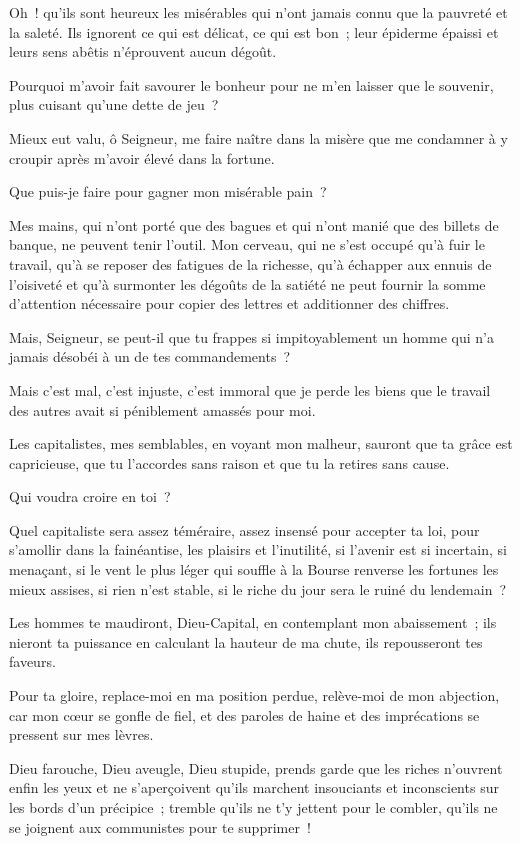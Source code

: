 \documentclass[french,twoside]{book} %
\begin{document}
Oh ! qu’ils sont heureux les misérables qui n’ont jamais connu que la pauvreté et la saleté. Ils ignorent ce qui est délicat, ce qui est bon ; leur épiderme épaissi et leurs sens abêtis n’éprouvent aucun dégoût.\par
Pourquoi m’avoir fait savourer le bonheur pour ne m’en laisser que le souvenir, plus cuisant qu’une dette de jeu ?\par
Mieux eut valu, ô Seigneur, me faire naître dans la misère que me condamner à y croupir après m’avoir élevé dans la fortune.\par
Que puis-je faire pour gagner mon misérable pain ?\par
Mes mains, qui n’ont porté que des bagues et qui n’ont manié que des billets de banque, ne peuvent tenir l’outil. Mon cerveau, qui ne s’est occupé qu’à fuir le travail, qu’à se reposer des fatigues de la richesse, qu’à échapper aux ennuis de l’oisiveté et qu’à surmonter les dégoûts de la satiété ne peut fournir la somme d’attention nécessaire pour copier des lettres et additionner des chiffres.\par
Mais, Seigneur, se peut-il que tu frappes si impitoyablement un homme qui n’a jamais désobéi à un de tes commandements ?\par
Mais c’est mal, c’est injuste, c’est immoral que je perde les biens que le travail des autres avait si péniblement amassés pour moi.\par
Les capitalistes, mes semblables, en voyant mon malheur, sauront que ta grâce est capricieuse, que tu l’accordes sans raison et que tu la retires sans cause.\par
Qui voudra croire en toi ?\par
Quel capitaliste sera assez téméraire, assez insensé pour accepter ta loi, pour s’amollir dans la fainéantise, les plaisirs et l’inutilité, si l’avenir est si incertain, si menaçant, si le vent le plus léger qui souffle à la Bourse renverse les fortunes les mieux assises, si rien n’est stable, si le riche du jour sera le ruiné du lendemain ?\par
Les hommes te maudiront, Dieu-Capital, en contemplant mon abaissement ; ils nieront ta puissance en calculant la hauteur de ma chute, ils repousseront tes faveurs.\par
Pour ta gloire, replace-moi en ma position perdue, relève-moi de mon abjection, car mon cœur se gonfle de fiel, et des paroles de haine et des imprécations se pressent sur mes lèvres.\par
Dieu farouche, Dieu aveugle, Dieu stupide, prends garde que les riches n’ouvrent enfin les yeux et ne s’aperçoivent qu’ils marchent insouciants et inconscients sur les bords d’un précipice ; tremble qu’ils ne t’y jettent pour le combler, qu’ils ne se joignent aux communistes pour te supprimer !\par
\end{document}
